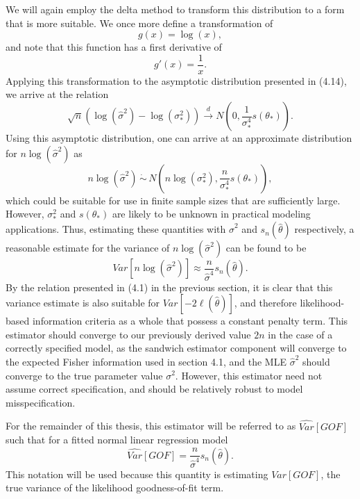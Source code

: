 		We will again employ the delta method to transform this distribution to a form that is more suitable. We once more define a transformation of
		\begin{equation}
			g(x) = \log(x) ,
		\end{equation}
		and note that this function has a first derivative of
		\begin{equation}
			g'(x) = \frac{1}{x} .
		\end{equation}
		Applying this transformation to the asymptotic distribution presented in (4.14), we arrive at the relation
		\begin{equation}
			\sqrt{n} ( \log (\hat{\sigma}^2) - \log(\sigma_*^2)) \xrightarrow[]{d} N(0, \frac{1}{\sigma_*^4} s(\theta_*)) .
		\end{equation}
		Using this asymptotic distribution, one can arrive at an approximate distribution for $n\log(\hat{\sigma}^2)$ as
		\begin{equation}
			n\log(\hat{\sigma}^2) \, \dot\sim \, N \left( n\log(\sigma_* ^2), \frac{n}{\sigma_*^4} s(\theta_*) \right) ,
		\end{equation}
		which could be suitable for use in finite sample sizes that are sufficiently large. However, $\sigma_*^2$ and $s(\theta_*)$ are likely to be unknown in practical modeling
		applications. Thus, estimating these quantities with $\hat{\sigma}^2$ and $s_n(\hat{\theta})$ respectively, a reasonable estimate for the variance of $n\log(\hat{\sigma}^2)$ can
		be found to be
		\begin{equation}
			Var \left[ n\log(\hat{\sigma}^2) \right] \approx \frac{n}{\hat{\sigma}^4} s_n(\hat{\theta}) .
		\end{equation}
		By the relation presented in (4.1) in the previous section, it is clear that this variance estimate is also suitable for $Var \left[ -2 \ell (\hat{\theta}  ) \right]$, and therefore
		likelihood-based information criteria as a whole that possess a constant penalty term. This estimator should converge to our previously derived value $2n$ in the case of a correctly
		specified model, as the sandwich estimator component will converge to the expected Fisher information used in section 4.1, and the MLE $\hat{\sigma}^2$ should converge to the true
		parameter value $\sigma^2$. However, this estimator need not assume correct specification, and should be relatively robust to model misspecification.
		
		For the remainder of this thesis, this estimator will be referred to as $\widehat{Var}[GOF]$ such that for a fitted normal linear regression model
		\begin{equation}
			\widehat{Var}[GOF] = \frac{n}{\hat{\sigma}^4} s_n(\hat{\theta}) .
		\end{equation}
		This notation will be used because this quantity is estimating $Var[GOF]$, the true variance of the likelihood goodness-of-fit
		term.
		
